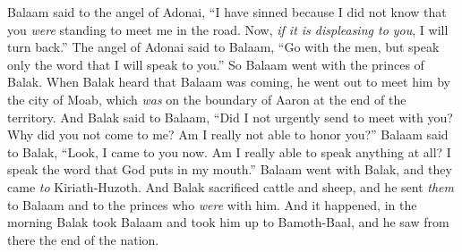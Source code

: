 \begin{biblechapter}
\verse Balaam said to the angel of Adonai, “I have sinned because I did not know that you \textit{were} standing to meet me in the road. Now, \textit{if it is displeasing to you}, I will turn back.”
\verse The angel of Adonai said to Balaam, “Go with the men, but speak only the word that I will speak to you.” So Balaam went with the princes of Balak.
\verse When Balak heard that Balaam was coming, he went out to meet him by the city of Moab, which \textit{was} on the boundary of Aaron at the end of the territory.
\verse And Balak said to Balaam, “Did I not urgently send to meet with you? Why did you not come to me? Am I really not able to honor you?”
\verse Balaam said to Balak, “Look, I came to you now. Am I really able to speak anything at all? I speak the word that God puts in my mouth.”
\verse Balaam went with Balak, and they came \textit{to} Kiriath-Huzoth.
\verse And Balak sacrificed cattle and sheep, and he sent \textit{them} to Balaam and to the princes who \textit{were} with him.
\verse And it happened, in the morning Balak took Balaam and took him up to Bamoth-Baal, and he saw from there the end of the nation.
\end{biblechapter}

